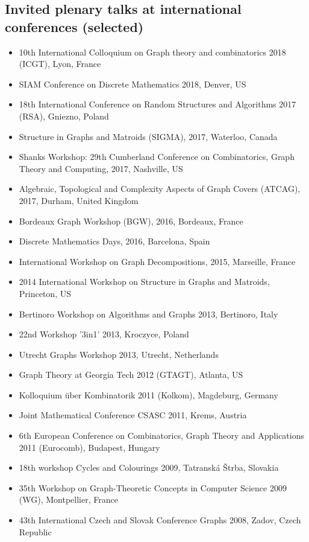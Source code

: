 \documentclass[11pt]{article}
\begin{document}
\subsection*{Invited plenary talks at international conferences (selected)}
\begin{itemize}
\setlength\itemsep{-1mm}
\item 10th International Colloquium on Graph theory and combinatorics 2018 (ICGT), Lyon, France
\item SIAM Conference on Discrete Mathematics 2018, Denver, US
\item 18th International Conference on Random Structures and Algorithms 2017 (RSA), Gniezno, Poland
\item Structure in Graphs and Matroids (SIGMA), 2017, Waterloo, Canada
\item Shanks Workshop: 29th Cumberland Conference on Combinatorics, Graph Theory and Computing, 2017, Nashville, US
\item Algebraic, Topological and Complexity Aspects of Graph Covers (ATCAG), 2017, Durham, United Kingdom
\item Bordeaux Graph Workshop (BGW), 2016, Bordeaux, France
\item Discrete Mathematics Days, 2016, Barcelona, Spain
\item International Workshop on Graph Decompositions, 2015, Marseille, France
\item 2014 International Workshop on Structure in Graphs and Matroids, Princeton, US
\item Bertinoro Workshop on Algorithms and Graphs 2013, Bertinoro, Italy
\item 22nd Workshop '3in1' 2013, Kroczyce, Poland
\item Utrecht Graphs Workshop 2013, Utrecht, Netherlands
\item Graph Theory at Georgia Tech 2012 (GTAGT), Atlanta, US
\item Kolloquium \"uber Kombinatorik 2011 (Kolkom), Magdeburg, Germany
\item Joint Mathematical Conference CSASC 2011, Krems, Austria
\item 6th European Conference on Combinatorics, Graph Theory and Applications 2011 (Eurocomb), Budapest, Hungary
\item 18th workshop Cycles and Colourings 2009, Tatransk\'a \v Strba, Slovakia
\item 35th Workshop on Graph-Theoretic Concepts in Computer Science 2009 (WG), Montpellier, France
\item 43th International Czech and Slovak Conference Graphs 2008, Zadov, Czech Republic
\end{itemize}
\end{document}
